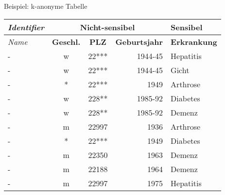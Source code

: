 \begin{frame}{Beispiel: k-anonyme Tabelle}
	\begin{center}
		\begin{tabular}{|l|c|c|r|l|}
		\hline \textit{Identifier} & \multicolumn{3}{c|}{\textbf{Nicht-sensibel}} & \textbf{Sensibel} \\ 
		\hline \textit{Name} & \textbf{Geschl.} & \textbf{PLZ} & \textbf{Geburtsjahr} & \textbf{Erkrankung} \\ \hline
		\hline \rowcolor{svshellblau1!30} - & w & 22*** & 1944-45 & Hepatitis \\ 
		\hline \rowcolor{svshellblau1!30} - & w & 22*** & 1944-45 & Gicht \\
		\hline \rowcolor{svsgrau1!30} - & * & 22*** & 1949 & Arthrose \\ 
		\hline \rowcolor{svshellblau2!30} - & w & 228** & 1985-92 & Diabetes \\ 
		\hline \rowcolor{svshellblau2!30} - & w & 228** & 1985-92 & Demenz \\  
		\hline - & m & 22997 & 1936 & Arthrose \\ 
		\hline \rowcolor{svsgrau1!30}- & * & 22*** & 1949 & Diabetes \\ 
		\hline - & m & 22350 & 1963 & Demenz \\ 
		\hline - & m & 22188 & 1964 & Demenz \\ 
		\hline - & m & 22997 & 1975 & Hepatitis \\ 
		\hline 
		\end{tabular}
	\end{center}
\end{frame}

